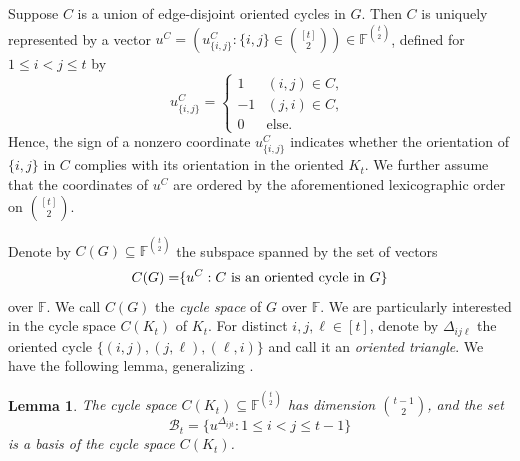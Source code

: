 \documentclass[11pt]{article}
\newtheorem{lemma}[theorem]{Lemma}
\newcommand\black[1]{{\color{black} #1}}
\begin{document}
 Suppose $C$ is a union of edge-disjoint oriented cycles in $G$.
Then $C$ is uniquely represented by a vector $u^C=(u^C_{\{i,j\}}: \{i,j\}\in \binom{[t]}{2})\in\mathbb{F}^{\binom{t}{2}}$, defined  for $ 1\leq i<j\leq t$ by
 \[
u^C_{\{i,j\}}=\begin{cases}1 & (i,j)\in C, \\
 -1 & (j,i)\in C, \\
 0 & \text{else}.
 \end{cases}  \
 \]
 Hence, the sign of a nonzero coordinate  $u^C_{\{i,j\}}$ indicates whether the orientation of $\{i,j\}$ in $C$ complies with its orientation in \black{the oriented $K_t$}. %
We further assume that the coordinates of $u^C $ are ordered by the aforementioned lexicographic order on $\binom{[t]}{2}$.



Denote by $C(G)\subseteq \mathbb{F}^{\binom{t}{2}}$ the subspace spanned by the set of vectors  $$\black{C(G)=}\{u^C: C \text{ is an oriented cycle in } G\}$$ over $\mathbb{F}$.
We call $C(G)$ the {\it cycle space} of $G$ over $\mathbb{F}$. We are particularly interested in the cycle space $C(K_t)$ of $K_t$.
For distinct $i,j,\ell\in [t]$, denote by $\Delta_{ij\ell}$ the oriented cycle $\{(i,j), (j,\ell),(\ell, i)\}$ and call it  an {\it oriented triangle}.
We have the following lemma, generalizing \cite[Theorem 1.9.5]{diestel2017graphentheory}.

\begin{lemma} \label{cycle-space-basis}
The \black{cycle} space $C(K_t)\subseteq \mathbb{F}^{\binom{t}{2}}$ has dimension $\binom{t-1}{2}$, and the set
\[
\mathcal{B}_t=\{u^{\Delta_{ijt}}:1\le i<j\le t-1\}
\]
 is a basis of \black{the cycle space} $C(K_t)$.
\end{lemma}
\end{document}

